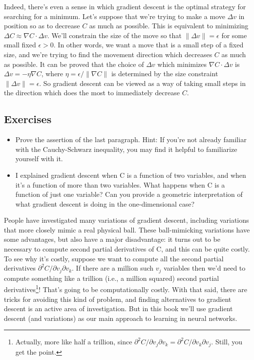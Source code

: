 \documentclass[a4paper,twoside,10pt]{book}
\begin{document}
Indeed, there's even a sense in which gradient descent is the optimal strategy for searching for a minimum. Let's suppose that we're trying to make a move $\Delta v$ in position so as to decrease $C$ as much as possible. This is equivalent to minimizing $\Delta C \approx \nabla C \cdot \Delta v$. We'll constrain the size of the move so that $\|\Delta v\| = \epsilon$ for some small fixed $\epsilon > 0$. In other words, we want a move that is a small step of a fixed size, and we're trying to find the movement direction which decreases $C$ as much as possible. It can be proved that the choice of $\Delta v$ which minimizes $\nabla C \cdot \Delta v$ is $\Delta v = - \eta \nabla C$, where $\eta = \epsilon / \|\nabla C\|$ is determined by the size constraint $\|\Delta v\| = \epsilon$. So gradient descent can be viewed as a way of taking small steps in the direction which does the most to immediately decrease $C$.

\subsection*{Exercises}
\begin{itemize}
\item Prove the assertion of the last paragraph. Hint: If you're not already familiar with the Cauchy-Schwarz inequality, you may find it helpful to familiarize yourself with it.
\item I explained gradient descent when C is a function of two variables, and when it's a function of more than two variables. What happens when C is a function of just one variable? Can you provide a geometric interpretation of what gradient descent is doing in the one-dimensional case?
\end{itemize}

People have investigated many variations of gradient descent, including variations that more closely mimic a real physical ball. These ball-mimicking variations have some advantages, but also have a major disadvantage: it turns out to be necessary to compute second partial derivatives of C, and this can be quite costly. To see why it's costly, suppose we want to compute all the second partial derivatives $\partial^2 C/ \partial v_j \partial v_k$. If there are a million such $v_j$ variables then we'd need to compute something like a trillion (i.e., a million squared) second partial derivatives\footnote{Actually, more like half a trillion, since $\partial^2 C/ \partial v_j \partial v_k = \partial^2 C/ \partial v_k \partial v_j$. Still, you get the point.}! That's going to be computationally costly. With that said, there are tricks for avoiding this kind of problem, and finding alternatives to gradient descent is an active area of investigation. But in this book we'll use gradient descent (and variations) as our main approach to learning in neural networks.
\end{document}
